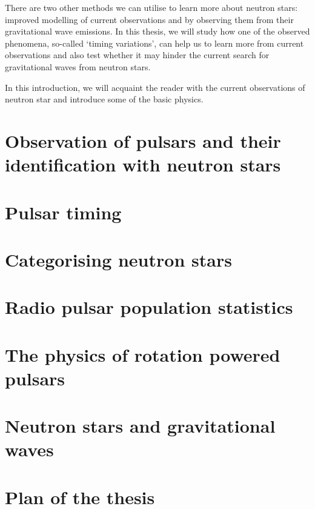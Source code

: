 \documentclass[../full_thesis/full_thesis.tex]{subfiles}
\newcommand{\thisdir}{../introduction}
\begin{document}
There are two other methods we can utilise to learn more about neutron stars: improved
modelling of current observations and by observing them from their
gravitational wave emissions. In this thesis, we will study how one of the
observed phenomena, so-called `timing variations', can help us to learn more
from current observations and also test whether it may hinder the current
search for gravitational waves from neutron stars.

In this introduction, we will acquaint the reader with the current observations
of neutron star and introduce some of the basic physics.

\section{Observation of pulsars and their identification with neutron stars}


\section{Pulsar timing}
\label{sec: pulsar timing methods}


\section{Categorising neutron stars}
\label{sec: categorising neutron stars}


\section{Radio pulsar population statistics}
\label{sec: population stats}


\section{The physics of rotation powered pulsars} 
\label{sec: rotation powered pulsars}


\section{Neutron stars and gravitational waves}
\label{sec: gravitational waves}



\section{Plan of the thesis}
\end{document}
